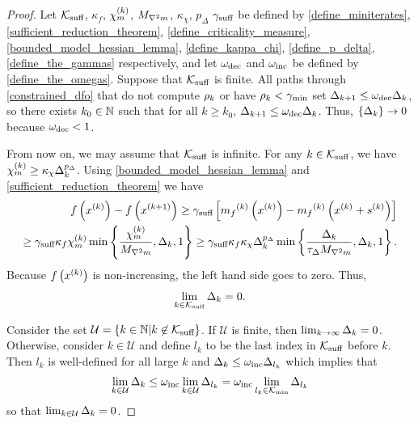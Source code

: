 \begin{proof}

Let
${\mathcal K_{\textrm{suff}}}$, $\kappa_f$, ${\chi_m^{(k)}}$, ${M_{\nabla^2 m}}$, $\kappa_{\chi}$, $p_{\Delta}$ $\gamma_{\textrm{suff}}$
be defined by
\cref{define_miniterates}, \cref{sufficient_reduction_theorem}, \cref{define_criticality_measure}, \cref{bounded_model_hessian_lemma}, \cref{define_kappa_chi}, \cref{define_p_delta}, \cref{define_the_gammas}
respectively,
and let $\omega_{\text{dec}}$ and $\omega_{\text{inc}}$ be defined by \cref{define_the_omegas}.
Suppose that ${\mathcal K_{\textrm{suff}}}$ is finite.
All paths through \cref{constrained_dfo} that do not compute $\rho_k$ or have $\rho_k < \gamma_{\textrm{min}}$ 
set $\Delta_{k+1} \le \omega_{\text{dec}} \Delta_k$, so there exists $k_0 \in \mathbb N$ such that for all $k \ge  k_0$, $\Delta_{k+1} \le \omega_{\text{dec}} \Delta_k$.
Thus, $\left\{\Delta_k\right\} \to 0$ because $\omega_{\text{dec}} < 1$.



From now on, we may assume that ${\mathcal K_{\textrm{suff}}}$ is infinite.  
For any $k \in {\mathcal K_{\textrm{suff}}}$, we have ${\chi_m^{(k)}} \ge \kappa_{\chi}\Delta_k^{p_{\Delta}}$.
Using \cref{bounded_model_hessian_lemma} and \cref{sufficient_reduction_theorem} we have
\begin{align*}
f\left(x^{(k)}\right) - f\left({{x}^{(k+1)}}\right) \ge \gamma_{\textrm{suff}} \left[{{m}_f}^{(k)}\left(x^{(k)}\right) - {{m}_f}^{(k)}\left(x^{(k)} + {{s}^{(k)}}\right)\right] \\
\ge \gamma_{\textrm{suff}} \kappa_f {\chi_m^{(k)}} \min\left\{\frac{{\chi_m^{(k)}}}{{M_{\nabla^2 m}}}, \Delta_k, 1\right\}
\ge \gamma_{\textrm{suff}} \kappa_f \kappa_{\chi}\Delta_k^{p_{\Delta}}\min\left\{\frac{\Delta_k}{\tau_{\Delta} {M_{\nabla^2 m}}}, \Delta_k, 1\right\}.
\end{align*}
% 
Because $f\left(x^{(k)}\right)$ is non-increasing, the left hand side goes to zero.
Thus,
\begin{align}
\lim_{k \in {\mathcal K_{\textrm{suff}}}} \Delta_k = 0.
\end{align}

Consider the set
$\mathcal U = \{ k \in \mathbb N | k \not \in {\mathcal K_{\textrm{suff}}} \}$.
If $\mathcal U$ is finite, then $\lim_{k\to\infty}\Delta_k = 0$.
Otherwise, consider $k \in \mathcal U$ and define $l_k$ to be the last index in ${\mathcal K_{\textrm{suff}}}$ before $k$.
Then $l_k$ is well-defined for all large $k$  and $\Delta_k \le \omega_{\text{inc}} \Delta_{l_k}$ which implies that
\begin{align}
\lim_{k \in \mathcal U } \Delta_k \le \omega_{\text{inc}} \lim_{k \in \mathcal U} \Delta_{l_k} = \omega_{\text{inc}} \lim_{l_k \in {\mathcal K_{\textrm{min}}}} \Delta_{l_k}
\end{align}
so that $\lim_{k \in \mathcal U} \Delta_k = 0$.
\end{proof}


